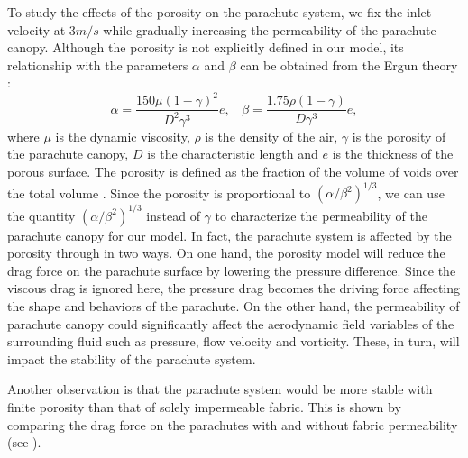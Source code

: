 To study the effects of the porosity on the parachute system,
we fix the inlet velocity at $3m/s$ while gradually increasing the
permeability of the parachute canopy. Although the porosity 
is not explicitly defined in our model, its relationship with the
parameters $\alpha$ and $\beta$ can be obtained
from the Ergun theory \cite{tutt2010development}:
\begin{equation}
\alpha = \frac{150\mu(1-\gamma)^2}{D^2\gamma^3}e, ~~~~
\beta  = \frac{1.75\rho(1-\gamma)}{D\gamma^3}e,
\end{equation}
where $\mu$ is the dynamic viscosity, $\rho$ is the density
of the air, $\gamma$ is the porosity of the parachute canopy,
$D$ is the characteristic length and $e$ is the thickness of the
porous surface. The porosity is defined 
as the fraction of the volume of voids over the total volume \cite{tutt2010development}.
Since the porosity is proportional to
$(\alpha/\beta^2)^{1/3}$, we can use the quantity  $(\alpha/\beta^2)^{1/3}$
instead of $\gamma$ to characterize the permeability of the
parachute canopy for our model. In fact, the parachute system is
affected by the porosity through in two ways. On one hand, the
porosity model will reduce the drag force on the parachute surface
by lowering the pressure difference. Since the viscous 
drag is ignored here, the pressure drag becomes the driving force affecting 
the shape and behaviors of the parachute.
On the other hand, the permeability
of parachute canopy could significantly affect the aerodynamic
field variables of the surrounding fluid such as pressure, flow velocity
and vorticity. These, in turn, will impact the stability of the
parachute system.

Another observation is that the parachute system would be more stable with
finite porosity than that of solely impermeable fabric.  This is shown by
comparing the drag force on the parachutes with and without fabric permeability
(see ).  

